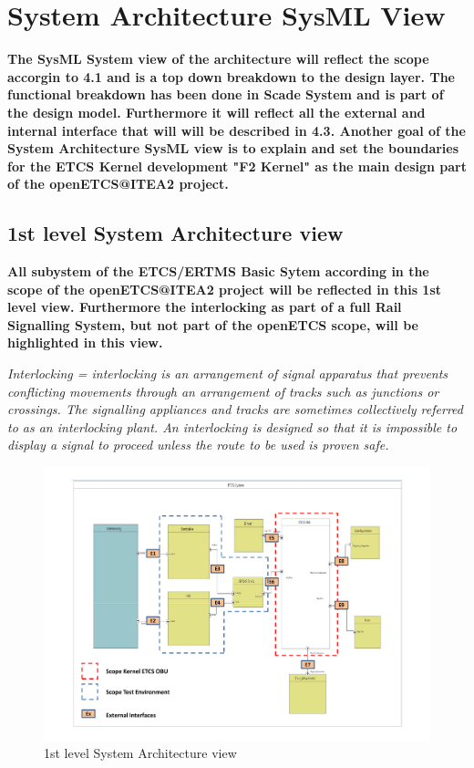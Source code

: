 \section{System Architecture SysML View}
\textbf{The SysML System view of the architecture will reflect the scope accorgin to 4.1 and is a top down breakdown to the design layer. The functional breakdown has been done in Scade System and is part of the design model. Furthermore it will reflect all the external and internal interface that will will be described in 4.3. Another goal of the System Architecture SysML view is to explain and set the boundaries for the ETCS Kernel development "F2 Kernel" as the main design part of the openETCS@ITEA2 project.}

\subsection{1st level System Architecture view}
\textbf{All subystem of the ETCS/ERTMS Basic Sytem according in the scope of the openETCS@ITEA2 project will be reflected in this 1st level view. Furthermore the interlocking as part of a full Rail Signalling System, but not part of the openETCS scope, will be highlighted in this view.}

\textit{Interlocking =  interlocking is an arrangement of signal apparatus that prevents conflicting movements through an arrangement of tracks such as junctions or crossings. The signalling appliances and tracks are sometimes collectively referred to as an interlocking plant. An interlocking is designed so that it is impossible to display a signal to proceed unless the route to be used is proven safe.}


\begin{figure}[h]
\centering
\includegraphics[scale=0.6]{images/1stLevelSystem}
\caption{1st level System Architecture view}
\label{1st level System Architecture view}
\end{figure}

